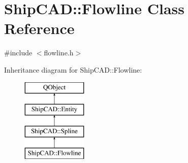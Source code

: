 \hypertarget{classShipCAD_1_1Flowline}{}\section{Ship\+C\+AD\+:\+:Flowline Class Reference}
\label{classShipCAD_1_1Flowline}


{\ttfamily \#include $<$flowline.\+h$>$}

Inheritance diagram for Ship\+C\+AD\+:\+:Flowline\+:\begin{figure}[H]
\begin{center}
\leavevmode
\includegraphics[height=4.000000cm]{classShipCAD_1_1Flowline}
\end{center}
\end{figure}
